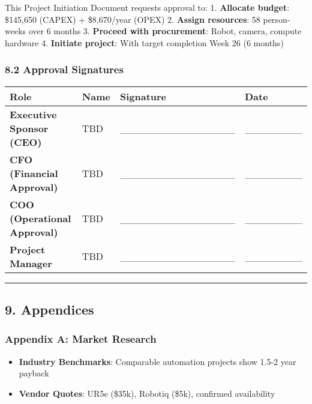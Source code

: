 \documentclass[
]{article}
\providecommand{\tightlist}{%
  \setlength{\itemsep}{0pt}\setlength{\parskip}{0pt}}
\begin{document}
This Project Initiation Document requests approval to: 1.
\textbf{Allocate budget}: \$145,650 (CAPEX) + \$8,670/year (OPEX) 2.
\textbf{Assign resources}: 58 person-weeks over 6 months 3.
\textbf{Proceed with procurement}: Robot, camera, compute hardware 4.
\textbf{Initiate project}: With target completion Week 26 (6 months)

\hypertarget{approval-signatures}{%
\subsubsection{8.2 Approval Signatures}\label{approval-signatures}}

\begin{longtable}[]{@{}llll@{}}
\toprule\noalign{}
\textbf{Role} & \textbf{Name} & \textbf{Signature} & \textbf{Date} \\
\midrule\noalign{}
\endhead
\bottomrule\noalign{}
\endlastfoot
\textbf{Executive Sponsor (CEO)} & TBD &
\_\_\_\_\_\_\_\_\_\_\_\_\_\_\_\_ & \_\_\_\_\_\_\_\_ \\
\textbf{CFO (Financial Approval)} & TBD &
\_\_\_\_\_\_\_\_\_\_\_\_\_\_\_\_ & \_\_\_\_\_\_\_\_ \\
\textbf{COO (Operational Approval)} & TBD &
\_\_\_\_\_\_\_\_\_\_\_\_\_\_\_\_ & \_\_\_\_\_\_\_\_ \\
\textbf{Project Manager} & TBD & \_\_\_\_\_\_\_\_\_\_\_\_\_\_\_\_ &
\_\_\_\_\_\_\_\_ \\
\end{longtable}

\begin{center}\rule{0.5\linewidth}{0.5pt}\end{center}

\hypertarget{appendices}{%
\subsection{9. Appendices}\label{appendices}}

\hypertarget{appendix-a-market-research}{%
\subsubsection{Appendix A: Market
Research}\label{appendix-a-market-research}}

\begin{itemize}
\tightlist
\item
  \textbf{Industry Benchmarks}: Comparable automation projects show
  1.5-2 year payback
\item
  \textbf{Vendor Quotes}: UR5e (\$35k), Robotiq (\$5k), confirmed
  availability
\end{itemize}
\end{document}
